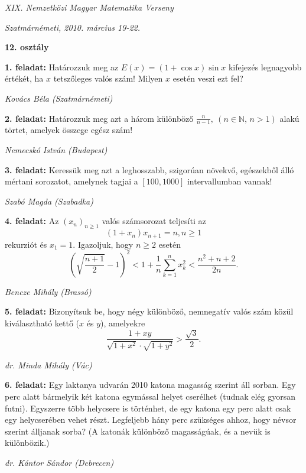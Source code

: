 \documentclass[a4paper,10pt]{article}
\def\ki#1#2{\hfill {\it #1 (#2)}\medskip}
\begin{document}
\begin{center} \Large {\em XIX. Nemzetközi Magyar Matematika Verseny} \end{center}
\begin{center} \large{\em Szatmárnémeti, 2010. március 19-22.} \end{center}
\smallskip
\begin{center} \large{\bf 12. osztály} \end{center}
\bigskip 

{\bf 1. feladat: } Határozzuk meg az $E(x)=(1+\cos{x})\sin{x}$ kifejezés legnagyobb
értékét, ha $x$ tetszőleges valós szám! Milyen $x$ esetén veszi ezt
fel?

\ki{Kovács Béla}{Szatmárnémeti}\medskip

{\bf 2. feladat: } Határozzuk meg azt a három különböző
$\displaystyle\frac{n}{n-1},\ (n\in\mathbb{N}, \, n>1)$
alakú törtet, amelyek összege egész szám!

\ki{Nemecskó István}{Budapest}\medskip

{\bf 3. feladat: } Keressük meg azt a leghosszabb, szigorúan növekvő, egészekből álló
mértani sorozatot, amelynek tagjai a $[100,1000]$ intervallumban
vannak!

\ki{Szabó Magda}{Szabadka}\medskip

{\bf 4. feladat: } Az $(x_n)_{n\geq 1}$ valós számsorozat teljesíti az
$$(1+x_n)x_{n+1}=n, n\geq 1$$ rekurziót és $x_1=1.$ Igazoljuk,
hogy $n\geq 2$ esetén
$$\left (\sqrt{\frac{n+1}{2}}-1 \right)^2<1+\frac 1n\sum\limits_{k=1}^n x_k^2<\frac{n^2+n+2}{2n}.$$


\ki{Bencze Mihály}{Brassó}\medskip

{\bf 5. feladat: } Bizonyítsuk be, hogy négy különböző, nemnegatív valós szám közül
kiválasztható  kettő ($x$ és $y$), amelyekre
$$\frac{1+xy}{\sqrt{1+x^2}\cdot\sqrt{1+y^2}}>\frac{\sqrt{3}}{2}.$$

\ki{dr. Minda Mihály}{Vác}\medskip

{\bf 6. feladat: } Egy laktanya udvarán 2010 katona magasság szerint
  áll sorban. Egy perc alatt bármelyik két katona egymással helyet
  cserélhet (tudnak elég gyorsan futni). Egyszerre több helycsere
  is történhet, de egy katona egy perc alatt csak egy helycserében
  vehet részt. Legfeljebb hány perc szükséges ahhoz, hogy névsor
  szerint álljanak sorba? (A katonák különböző magasságúak, és a
  nevük is különbözik.)

\ki{dr. Kántor Sándor}{Debrecen}\medskip

\vfill
\end{document}
